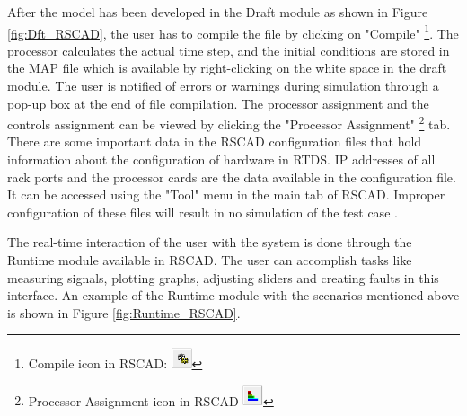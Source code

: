 After the model has been developed in the Draft module as shown in Figure \ref{fig:Dft_RSCAD}, the user has to compile the file by clicking on "Compile" \footnote{Compile icon in RSCAD: \includegraphics[width=0.6cm, height=0.6cm]{Diagrams/Chapter_3/Compile_pic.PNG}}. The processor calculates the actual time step, and the initial conditions are stored in the MAP file which is available by right-clicking on the white space in the draft module. The user is notified of errors or warnings during simulation through a pop-up box at the end of file compilation. The processor assignment and the controls assignment can be viewed by clicking the "Processor Assignment" \footnote{Processor Assignment icon in RSCAD \includegraphics[width=0.6cm, height=0.6cm]{Diagrams/Chapter_3/Processor_assignment_pic.PNG}} tab. There are some important data in the RSCAD configuration files that hold information about the configuration of hardware in \gls{RTDS}. IP addresses of all rack ports and the processor cards are the data available in the configuration file. It can be accessed using the "Tool" menu in the main tab of RSCAD. Improper configuration of these files will result in no simulation of the test case \cite{rtds_tech}. 

The real-time interaction of the user with the system is done through the Runtime module available in RSCAD. The user can accomplish tasks like measuring signals, plotting graphs, adjusting sliders and creating faults in this interface. An example of the Runtime module with the scenarios mentioned above is shown in Figure \ref{fig:Runtime_RSCAD}.

